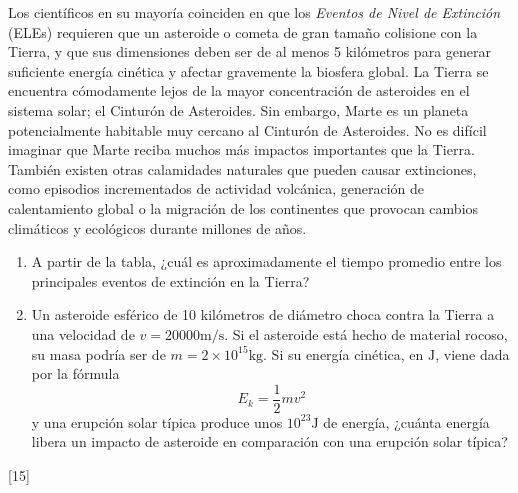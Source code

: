 \documentclass[a4paper]{article}
\newcommand{\m}{\text{m}}
\newcommand{\s}{\text{s}}
\newcommand{\kg}{\text{kg}}
\newcommand{\J}{\text{J}}
\newcounter{problema}
\begin{document}
\begin{problema}
Los científicos en su mayoría coinciden en que los \textit{Eventos de Nivel de Extinción} (ELEs) requieren que un asteroide o cometa de gran tamaño colisione con la Tierra, 
y que sus dimensiones deben ser de al menos 5 kilómetros para generar suficiente energía cinética y afectar gravemente la biosfera global. 
La Tierra se encuentra cómodamente lejos de la mayor concentración de asteroides en el sistema solar; el Cinturón de Asteroides. 
Sin embargo, Marte es un planeta potencialmente habitable muy cercano al Cinturón de Asteroides. 
No es difícil imaginar que Marte reciba muchos más impactos importantes que la Tierra. 
También existen otras calamidades naturales que pueden causar extinciones, como episodios incrementados de actividad volcánica, 
generación de calentamiento global o la migración de los continentes que provocan cambios climáticos y ecológicos durante millones de años.


\begin{enumerate}
	\item A partir de la tabla, ¿cuál es aproximadamente el tiempo promedio entre los principales eventos de extinción en la Tierra?

	\item Un asteroide esférico de 10 kilómetros de diámetro choca contra la Tierra a una velocidad de $v = 20000 \m/\s$. 
	Si el asteroide está hecho de material rocoso, su masa podría ser de $m = 2 \times 10^{15} \kg$. 
	Si su energía cinética, en $\J$, viene dada por la fórmula
	$$E_k = \frac{1}{2}mv^2$$
	y una erupción solar típica produce unos $10^{23} \J$ de energía, 
	¿cuánta energía libera un impacto de asteroide en comparación con una erupción solar típica?
\end{enumerate}

\end{problema}
[15] \cite{NASA_AstrobiologyMath}



\end{document}
